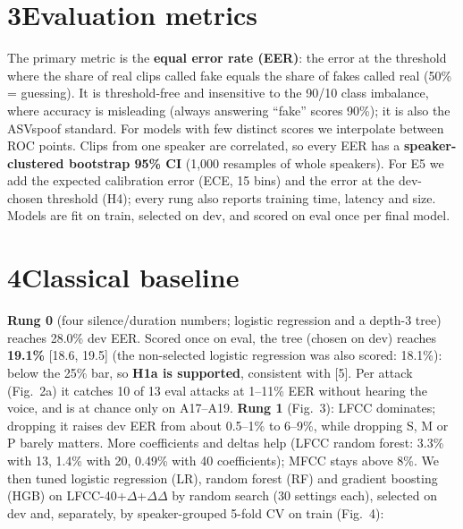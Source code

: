 \documentclass[10pt]{article}
\begin{document}
\section*{3\quad Evaluation metrics}
The primary metric is the \textbf{equal error rate (EER)}: the error at the threshold where the share
of real clips called fake equals the share of fakes called real (50\% = guessing). It is
threshold-free and insensitive to the 90/10 class imbalance, where accuracy is misleading (always
answering ``fake'' scores 90\%); it is also the ASVspoof standard. For models with few distinct scores
we interpolate between ROC points. Clips from one speaker are correlated, so every EER has a
\textbf{speaker-clustered bootstrap 95\% CI} (1,000 resamples of whole speakers). For E5 we add the
expected calibration error (ECE, 15 bins) and the error at the dev-chosen threshold (H4); every rung
also reports training time, latency and size. Models are fit on train, selected on dev, and scored on
eval once per final model.

\section*{4\quad Classical baseline}
\textbf{Rung 0} (four silence/duration numbers; logistic regression and a depth-3 tree) reaches
28.0\% dev EER. Scored once on eval, the tree (chosen on dev) reaches \textbf{19.1\%} [18.6, 19.5] (the non-selected logistic regression was also scored: 18.1\%): below the 25\% bar,
so \textbf{H1a is supported}, consistent with [5]. Per attack (Fig.~2a) it catches 10 of 13 eval attacks at 1--11\% EER
without hearing the voice, and is at chance only on A17--A19. \textbf{Rung 1} (Fig.~3): LFCC dominates;
dropping it raises dev EER from about 0.5--1\% to 6--9\%, while dropping S, M or P barely matters.
More coefficients and deltas help (LFCC random forest: 3.3\% with 13, 1.4\% with 20, 0.49\% with 40
coefficients); MFCC stays above 8\%. We then tuned logistic regression (LR), random forest (RF) and
gradient boosting (HGB) on LFCC-40+$\Delta$+$\Delta\Delta$ by random search (30 settings each),
selected on dev and, separately, by speaker-grouped 5-fold CV on train (Fig.~4):
\end{document}
